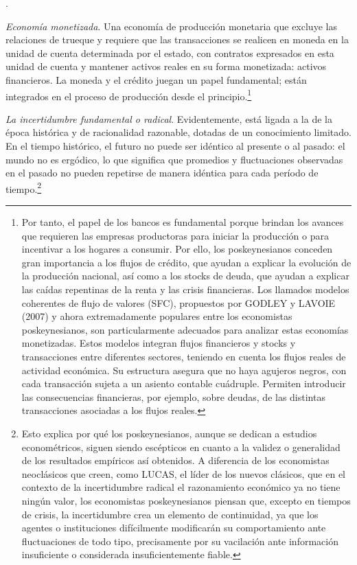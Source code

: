 \documentclass[10pt,a4paper]{article}
\newcounter{numitem}
\newenvironment{lnum}
      {\begin{list}{\arabic{numitem}.}{%
          \usecounter{numitem}%
          \setlength{\leftmargin}{1cm}%
          \setlength{\parskip}{3pt}%
          \setlength{\itemsep}{0pt}%
          \setlength{\parsep}{0pt}%
      }}
      {\end{list}}
\begin{document}
\begin{lnum}
{    }
    \item \textit{Economía monetizada}. Una economía de producción monetaria que excluye las relaciones de trueque y requiere que las transacciones se realicen en moneda en la unidad de cuenta determinada por el estado, con contratos expresados en esta unidad de cuenta y mantener activos reales en su forma monetizada: activos financieros. La moneda y el crédito juegan un papel fundamental; están integrados en el proceso de producción desde el principio.\footnote{%
        Por tanto, el papel de los bancos es fundamental porque brindan los avances que requieren las empresas productoras para iniciar la producción o para incentivar a los hogares a consumir. Por ello, los poskeynesianos conceden gran importancia a los flujos de crédito, que ayudan a explicar la evolución de la producción nacional, así como a los stocks de deuda, que ayudan a explicar las caídas repentinas de la renta y las crisis financieras. Los llamados modelos coherentes de flujo de valores (SFC), propuestos por GODLEY y LAVOIE (2007) y ahora extremadamente populares entre los economistas poskeynesianos, son particularmente adecuados para analizar estas economías monetizadas. Estos modelos integran flujos financieros y stocks y transacciones entre diferentes sectores, teniendo en cuenta los flujos reales de actividad económica. Su estructura asegura que no haya agujeros negros, con cada transacción sujeta a un asiento contable cuádruple. Permiten introducir las consecuencias financieras, por ejemplo, sobre deudas, de las distintas transacciones asociadas a los flujos reales.
    }
    \item \textit{La incertidumbre fundamental o radical}. Evidentemente, está ligada a la de la época histórica y de racionalidad razonable, dotadas de un conocimiento limitado. En el tiempo histórico, el futuro no puede ser idéntico al presente o al pasado: el mundo no es ergódico, lo que significa que promedios y fluctuaciones observadas en el pasado no pueden repetirse de manera idéntica para cada período de tiempo.\footnote{%
        Esto explica por qué los poskeynesianos, aunque se dedican a estudios econométricos, siguen siendo escépticos en cuanto a la validez o generalidad de los resultados empíricos así obtenidos. A diferencia de los economistas neoclásicos que creen, como LUCAS, el líder de los nuevos clásicos, que en el contexto de la incertidumbre radical el razonamiento económico ya no tiene ningún valor, los economistas poskeynesianos piensan que, excepto en tiempos de crisis, la incertidumbre crea un elemento de continuidad, ya que los agentes o instituciones difícilmente modificarán su comportamiento ante fluctuaciones de todo tipo, precisamente por su vacilación ante información insuficiente o considerada insuficientemente fiable.
}
\end{lnum}
\end{document}
